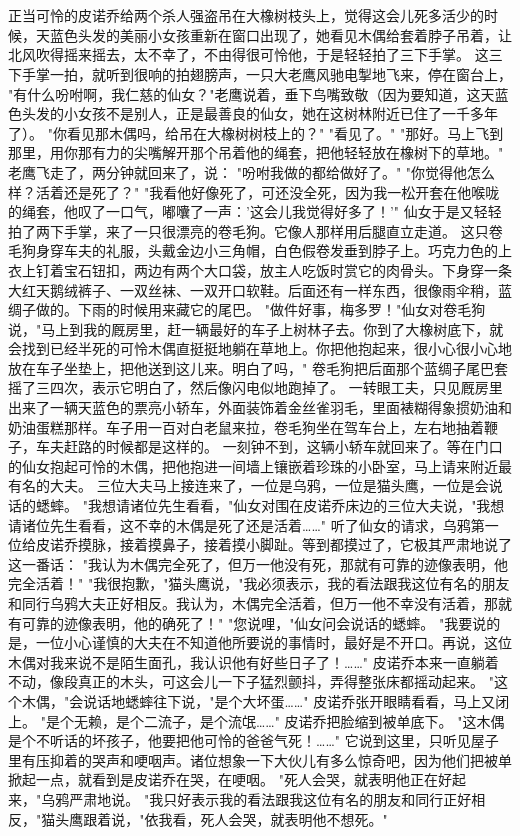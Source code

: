 \documentclass[12pt,UTF8]{ctexbook}
\begin{document}
\chapter{}

正当可怜的皮诺乔给两个杀人强盗吊在大橡树枝头上，觉得这会儿死多活少的时候，天蓝色头发的美丽小女孩重新在窗口出现了，她看见木偶给套着脖子吊着，让北风吹得摇来摇去，太不幸了，不由得很可怜他，于是轻轻拍了三下手掌。
这三下手掌一拍，就听到很响的拍翅膀声，一只大老鹰风驰电掣地飞来，停在窗台上，
"有什么吩咐啊，我仁慈的仙女？"老鹰说着，垂下鸟嘴致敬（因为要知道，这天蓝色头发的小女孩不是别人，正是最善良的仙女，她在这树林附近已住了一千多年了）。
"你看见那木偶吗，给吊在大橡树树枝上的？"
"看见了。"
"那好。马上飞到那里，用你那有力的尖嘴解开那个吊着他的绳套，把他轻轻放在橡树下的草地。"
老鹰飞走了，两分钟就回来了，说：
"吩咐我做的都给做好了。"
"你觉得他怎么样？活着还是死了？"
"我看他好像死了，可还没全死，因为我一松开套在他喉咙的绳套，他叹了一口气，嘟囔了一声：'这会儿我觉得好多了！'"
仙女于是又轻轻拍了两下手掌，来了一只很漂亮的卷毛狗。它像人那样用后腿直立走道。
这只卷毛狗身穿车夫的礼服，头戴金边小三角帽，白色假卷发垂到脖子上。巧克力色的上衣上钉着宝石钮扣，两边有两个大口袋，放主人吃饭时赏它的肉骨头。下身穿一条大红天鹅绒裤子、一双丝袜、一双开口软鞋。后面还有一样东西，很像雨伞稍，蓝绸子做的。下雨的时候用来藏它的尾巴。
"做件好事，梅多罗！"仙女对卷毛狗说，"马上到我的厩房里，赶一辆最好的车子上树林子去。你到了大橡树底下，就会找到已经半死的可怜木偶直挺挺地躺在草地上。你把他抱起来，很小心很小心地放在车子坐垫上，把他送到这儿来。明白了吗，"
卷毛狗把后面那个蓝绸子尾巴套摇了三四次，表示它明白了，然后像闪电似地跑掉了。
一转眼工夫，只见厩房里出来了一辆天蓝色的票亮小轿车，外面装饰着金丝雀羽毛，里面裱糊得象掼奶油和奶油蛋糕那样。车子用一百对白老鼠来拉，卷毛狗坐在驾车台上，左右地抽着鞭子，车夫赶路的时候都是这样的。
一刻钟不到，这辆小轿车就回来了。等在门口的仙女抱起可怜的木偶，把他抱进一间墙上镶嵌着珍珠的小卧室，马上请来附近最有名的大夫。
三位大夫马上接连来了，一位是乌鸦，一位是猫头鹰，一位是会说话的蟋蟀。
"我想请诸位先生看看，"仙女对围在皮诺乔床边的三位大夫说，"我想 请诸位先生看看，这不幸的木偶是死了还是活着……"
听了仙女的请求，乌鸦第一位给皮诺乔摸脉，接着摸鼻子，接着摸小脚趾。等到都摸过了，它极其严肃地说了这一番话：
"我认为木偶完全死了，但万一他没有死，那就有可靠的迹像表明，他完全活着！"
"我很抱歉，"猫头鹰说，"我必须表示，我的看法跟我这位有名的朋友和同行乌鸦大夫正好相反。我认为，木偶完全活着，但万一他不幸没有活着，那就有可靠的迹像表明，他的确死了！"
"您说哩，"仙女问会说话的蟋蟀。
"我要说的是，一位小心谨慎的大夫在不知道他所要说的事情时，最好是不开口。再说，这位木偶对我来说不是陌生面孔，我认识他有好些日子了！……"
皮诺乔本来一直躺着不动，像段真正的木头，可这会儿一下子猛烈颤抖，弄得整张床都摇动起来。
"这个木偶，"会说话地蟋蟀往下说，"是个大坏蛋……"
皮诺乔张开眼睛看看，马上又闭上。
"是个无赖，是个二流子，是个流氓……"
皮诺乔把脸缩到被单底下。
"这木偶是个不听话的坏孩子，他要把他可怜的爸爸气死！……"
它说到这里，只听见屋子里有压抑着的哭声和哽咽声。诸位想象一下大伙儿有多么惊奇吧，因为他们把被单掀起一点，就看到是皮诺乔在哭，在哽咽。
"死人会哭，就表明他正在好起来，"乌鸦严肃地说。
"我只好表示我的看法跟我这位有名的朋友和同行正好相反，"猫头鹰跟着说，"依我看，死人会哭，就表明他不想死。"
\end{document}
